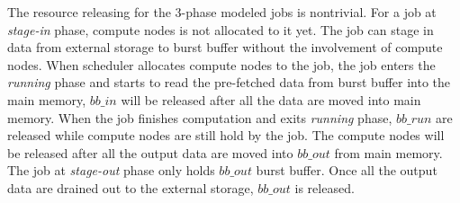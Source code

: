 The resource releasing for the 3-phase modeled jobs is nontrivial. 
For a job at \textit{stage-in} phase, compute nodes is not allocated to it yet. 
The job can stage in data from external storage to burst buffer without the involvement of compute nodes.
When scheduler allocates compute nodes to the job, the job enters the \textit{running} phase 
and starts to read the pre-fetched data from burst buffer into the main memory, 
$bb\_in$ will be released after all the data are moved into main memory. 
When the job finishes computation and exits \textit{running} phase, 
$bb\_run$ are released while compute nodes are still hold by the job. 
The compute nodes will be released after all the output data are moved into $bb\_out$ from main memory.
The job at \textit{stage-out} phase only holds $bb\_out$ burst buffer. 
Once all the output data are drained out to the external storage,  
$bb\_out$ is released.


